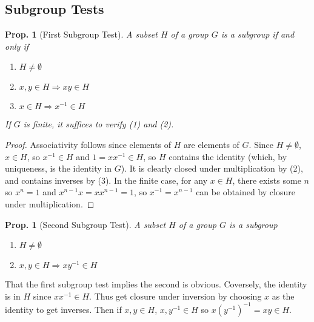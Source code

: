 \documentclass[12pt, a4paper]{book}
\newtheorem{proposition}[theorem]{Prop.}
\theoremstyle{nonumberplain}
\newtheorem{proof}{Proof}
\begin{document}
\subsection{Subgroup Tests}
\begin{proposition}[First Subgroup Test]
    A subset $H$ of a group $G$ is a subgroup if and only if
    \begin{enumerate}
        \item $H\neq\emptyset$
        \item $x,y\in H\Rightarrow xy\in H$
        \item $x\in H\Rightarrow x^{-1}\in H$
    \end{enumerate}
    If $G$ is finite, it suffices to verify (1) and (2).
\end{proposition}
\begin{proof}
    Associativity follows since elements of $H$ are elements of $G$.
    Since $H\neq\emptyset$, $x\in H$, so $x^{-1}\in H$ and $1=xx^{-1}\in H$, so $H$ contains the identity (which, by uniqueness, is the identity in $G$).
    It is clearly closed under multiplication by (2), and contains inverses by (3).
    In the finite case, for any $x\in H$, there exists some $n$ so $x^n=1$ and $x^{n-1}x=xx^{n-1}=1$, so $x^{-1}=x^{n-1}$ can be obtained by closure under multiplication.
\end{proof}
\begin{proposition}[Second Subgroup Test]
    A subset $H$ of a group $G$ is a subgroup
    \begin{enumerate}
        \item $H\neq\emptyset$
        \item $x,y\in H\Rightarrow xy^{-1}\in H$
    \end{enumerate}
\end{proposition}
That the first subgroup test implies the second is obvious.
Coversely, the identity is in $H$ since $xx^{-1}\in H$.
Thus get closure under inversion by choosing $x$ as the identity to get inverses.
Then if $x,y\in H$, $x,y^{-1}\in H$ so $x(y^{-1})^{-1}=xy\in H$.
\end{document}
